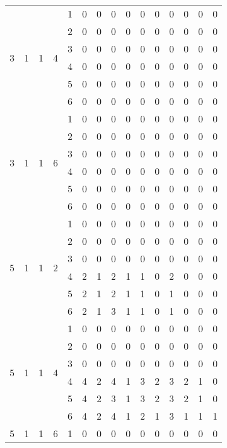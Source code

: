 \begin{longtable}{|c|c|c|c|c|c c|c c|c c|c c|c c|}
\hline
\multirow{6}{*}{3} & \multirow{6}{*}{1} & \multirow{6}{*}{1} & \multirow{6}{*}{4} & 1 & 0 & 0 & 0 & 0 & 0 & 0 & 0 & 0 & 0 & 0 \\
 & & & & 2 & 0 & 0 & 0 & 0 & 0 & 0 & 0 & 0 & 0 & 0 \\
 & & & & 3 & 0 & 0 & 0 & 0 & 0 & 0 & 0 & 0 & 0 & 0 \\
 & & & & 4 & 0 & 0 & 0 & 0 & 0 & 0 & 0 & 0 & 0 & 0 \\
 & & & & 5 & 0 & 0 & 0 & 0 & 0 & 0 & 0 & 0 & 0 & 0 \\
 & & & & 6 & 0 & 0 & 0 & 0 & 0 & 0 & 0 & 0 & 0 & 0 \\
\hline
\multirow{6}{*}{3} & \multirow{6}{*}{1} & \multirow{6}{*}{1} & \multirow{6}{*}{6} & 1 & 0 & 0 & 0 & 0 & 0 & 0 & 0 & 0 & 0 & 0 \\
 & & & & 2 & 0 & 0 & 0 & 0 & 0 & 0 & 0 & 0 & 0 & 0 \\
 & & & & 3 & 0 & 0 & 0 & 0 & 0 & 0 & 0 & 0 & 0 & 0 \\
 & & & & 4 & 0 & 0 & 0 & 0 & 0 & 0 & 0 & 0 & 0 & 0 \\
 & & & & 5 & 0 & 0 & 0 & 0 & 0 & 0 & 0 & 0 & 0 & 0 \\
 & & & & 6 & 0 & 0 & 0 & 0 & 0 & 0 & 0 & 0 & 0 & 0 \\
\hline
\multirow{6}{*}{5} & \multirow{6}{*}{1} & \multirow{6}{*}{1} & \multirow{6}{*}{2} & 1 & 0 & 0 & 0 & 0 & 0 & 0 & 0 & 0 & 0 & 0 \\
 & & & & 2 & 0 & 0 & 0 & 0 & 0 & 0 & 0 & 0 & 0 & 0 \\
 & & & & 3 & 0 & 0 & 0 & 0 & 0 & 0 & 0 & 0 & 0 & 0 \\
 & & & & 4 & 2 & 1 & 2 & 1 & 1 & 0 & 2 & 0 & 0 & 0 \\
 & & & & 5 & 2 & 1 & 2 & 1 & 1 & 0 & 1 & 0 & 0 & 0 \\
 & & & & 6 & 2 & 1 & 3 & 1 & 1 & 0 & 1 & 0 & 0 & 0 \\
\hline
\multirow{6}{*}{5} & \multirow{6}{*}{1} & \multirow{6}{*}{1} & \multirow{6}{*}{4} & 1 & 0 & 0 & 0 & 0 & 0 & 0 & 0 & 0 & 0 & 0 \\
 & & & & 2 & 0 & 0 & 0 & 0 & 0 & 0 & 0 & 0 & 0 & 0 \\
 & & & & 3 & 0 & 0 & 0 & 0 & 0 & 0 & 0 & 0 & 0 & 0 \\
 & & & & 4 & 4 & 2 & 4 & 1 & 3 & 2 & 3 & 2 & 1 & 0 \\
 & & & & 5 & 4 & 2 & 3 & 1 & 3 & 2 & 3 & 2 & 1 & 0 \\
 & & & & 6 & 4 & 2 & 4 & 1 & 2 & 1 & 3 & 1 & 1 & 1 \\
\hline
\multirow{6}{*}{5} & \multirow{6}{*}{1} & \multirow{6}{*}{1} & \multirow{6}{*}{6} & 1 & 0 & 0 & 0 & 0 & 0 & 0 & 0 & 0 & 0 & 0 \\

\end{longtable}
